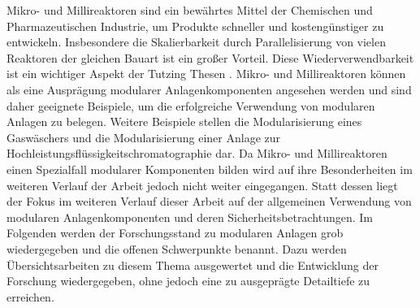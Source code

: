 Mikro- und Millireaktoren sind ein bew\"ahrtes Mittel der Chemischen und Pharmazeutischen Industrie, um Produkte schneller und kosteng\"unstiger zu entwickeln. Insbesondere die Skalierbarkeit durch Parallelisierung von vielen Reaktoren der gleichen Bauart ist ein gro\ss{}er Vorteil. Diese Wiederverwendbarkeit ist ein wichtiger Aspekt der Tutzing Thesen \cite{Processnet_2009}. Mikro- und Millireaktoren k\"onnen als eine Auspr\"agung modularer Anlagenkomponenten angesehen werden und sind daher geeignete Beispiele, um die erfolgreiche Verwendung von modularen Anlagen zu belegen. Weitere Beispiele stellen die Modularisierung eines  Gasw\"aschers \cite{Ohle_2014} und die Modularisierung einer Anlage zur Hochleistungsfl\"ussigkeitschromatographie \cite{Rottke_2012} dar. \newline
Da Mikro- und Millireaktoren einen Spezialfall modularer Komponenten bilden wird auf ihre Besonderheiten im weiteren Verlauf der Arbeit jedoch nicht weiter eingegangen. Statt dessen liegt der Fokus im weiteren Verlauf dieser Arbeit auf der allgemeinen Verwendung von modularen Anlagenkomponenten und deren Sicherheitsbetrachtungen. \newline
Im Folgenden werden der Forschungsstand zu modularen Anlagen grob wiedergegeben und die offenen Schwerpunkte benannt. Dazu werden \"Ubersichtsarbeiten zu diesem Thema ausgewertet und die Entwicklung der Forschung wiedergegeben, ohne jedoch eine zu ausgepr\"agte Detailtiefe zu erreichen.  

